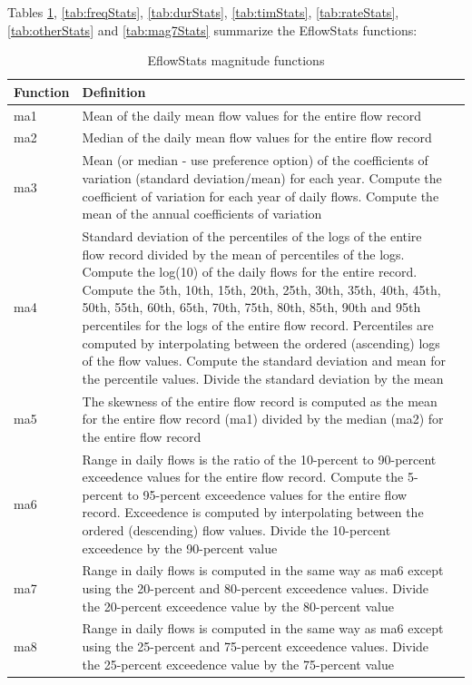 \documentclass[a4paper,11pt]{article}\usepackage[]{graphicx}\usepackage[]{color}
\begin{document}
Tables \ref{tab:magStats}, \ref{tab:freqStats}, \ref{tab:durStats}, \ref{tab:timStats}, \ref{tab:rateStats}, \ref{tab:otherStats} and \ref{tab:mag7Stats} summarize the EflowStats functions:

\begin{table}[ht]
  \centering
  \begin{threeparttable}[b]
  \caption{EflowStats magnitude functions}
  \label{tab:magStats}
  \begin{tabularx}{\textwidth}{lXl}
  \hline
\textbf{Function} & \textbf{Definition} \\ 
  \hline
  ma1 & Mean of the daily mean flow values for the entire flow record \\
  ma2 & Median of the daily mean flow values for the entire flow record \\
  ma3 & Mean (or median - use preference option) of the coefficients of 
  variation (standard deviation/mean) for each year. Compute the coefficient 
  of variation for each year of daily flows. Compute the mean of the annual 
  coefficients of variation \\
  ma4 & Standard deviation of the percentiles of the logs of the entire flow record divided by the mean of percentiles of the logs. Compute the log(10) of the daily flows for the entire record. Compute the 5th, 10th, 15th, 20th, 25th, 30th, 35th, 40th, 45th, 50th, 55th, 60th, 65th, 70th, 75th, 80th, 85th, 90th and 95th percentiles for the logs of the entire flow record. Percentiles are computed by interpolating between the ordered (ascending) logs of the flow values. Compute the standard deviation and mean for the percentile values. Divide the standard deviation by the mean \\
  ma5 & The skewness of the entire flow record is computed as the mean for the entire flow record (ma1) divided by the median (ma2) for the entire flow record \\
  ma6 & Range in daily flows is the ratio of the 10-percent to 90-percent exceedence values for the entire flow record. Compute the 5-percent to 95-percent exceedence values for the entire flow record. Exceedence is computed by interpolating between the ordered (descending) flow values. Divide the 10-percent exceedence by the 90-percent value \\
  ma7 & Range in daily flows is computed in the same way as ma6 except using the 20-percent and 80-percent exceedence values. Divide the 20-percent exceedence value by the 80-percent value \\
  ma8 & Range in daily flows is computed in the same way as ma6 except using the 25-percent and 75-percent exceedence values. Divide the 25-percent exceedence value by the 75-percent value \\

\end{tabularx}
\end{threeparttable}
\end{table}
\end{document}
